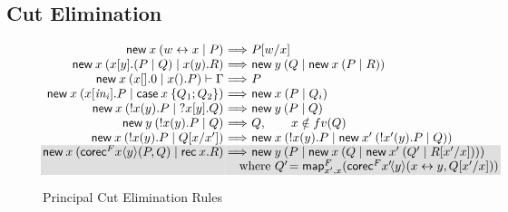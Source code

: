 \documentclass[orivec,envcountsame]{llncs}
\makeatletter
\newcommand{\cpbang}[1]{{! #1}}
\newcommand{\cptyp}[2]{#1 \vdash #2}
\newcommand{\mapname}{\mathsf{map}}
\newcommand{\map}[3]{\mapname^{#1}_{#2}(#3)}
\newcommand{\mkwd}[1]{\mathsf{#1}}
\newcommand{\link}[2]{#1 \leftrightarrow #2}
\newcommand{\cut}[4]{\mkwd{new}\:#1 \: (#3 \mid #4)}
\newcommand{\replicate}[2]{{!#1(#2)}}
\newcommand{\derelict}[2]{{?#1[#2]}}
\newcommand{\rec}[1]{\mkwd{rec}\:#1}
\newcommand{\clabel}[1]{\mathit{#1}}
\renewcommand{\case}[2]{\mkwd{case}\:#1\:\{#2\}}
\newcommand{\sel}[2]{#1[\clabel{#2}]}
\newcommand{\key}{\mkwd}
\newcommand{\ba}{\begin{array}}
\newcommand{\ea}{\end{array}}
\newenvironment{equations}{\[\ba{@{}r@{~}c@{~}l@{}}}{\ea\]}
\newcommand\shaderow{\noalign{\vskip-0.4pt}\rowcolor{shade}[0.6mm]}
\makeatother
\begin{document}
\subsection{Cut Elimination}

\begin{figure}[float]
\vspace{-2mm}
\small
\begin{equations}
\cut{x}{A}{\link{w}{x}}{P}
  &\Longrightarrow& P[w/x] \\
\cut{x}{A \otimes B}{x[y].(P \mid Q)}{x(y).R}
  &\Longrightarrow&
    \cut{y}{A}{Q}{\cut{x}{B}{P}{R}} \\
\cptyp{\cut{x}{1}{x[].0}{x().P}}{\Gamma}
  &\Longrightarrow&
    P \\
\cut{x}{A \oplus B}{\sel{x}{in_i}.P}{\case{x}{Q_1; Q_2}}
  &\Longrightarrow&
    \cut{x}{A}{P}{Q_i} \\
\cut{x}{\cpbang{A}}{\replicate{x}{y}.P}{\derelict{x}{y}.Q}
  &\Longrightarrow&
    \cut{y}{A}{P}{Q} \\
\cut{y}{\cpbang{A}}{\replicate{x}{y}.P}{Q}
  &\Longrightarrow&
     Q, \qquad x \notin fv(Q) \\
\cut{x}{\cpbang{A}}{\replicate{x}{y}.P}{Q[x/x']}
  &\Longrightarrow&
    \cut{x}{\cpbang{A}}{\replicate{x}{y}.P}{\cut{x'}{\cpbang{A}}{\replicate{x'}{y}.P}{Q}} \\ \shaderow
\key{new}\:x\: %
  (\key{corec}^F x\langle y \rangle(P, Q) \mid \rec{x}.R)
  &\Longrightarrow&
    \cut{y}{B}{P}{\cut{x}{F(B)}{Q}{\cut{x'}{F(\nu F)}{Q'}{R[x'/x]}}} \\ \shaderow
&& \hspace{-1em}\text{where }Q'\!= \map{F}{x',x}{\key{corec}^F x'\!\langle y \rangle(\link{x}{y}, Q[x'/x])} \\
\end{equations}%
\caption{Principal Cut Elimination Rules}\label{fig:beta-reduction}
\vspace{-2mm}
\end{figure}
\end{document}
